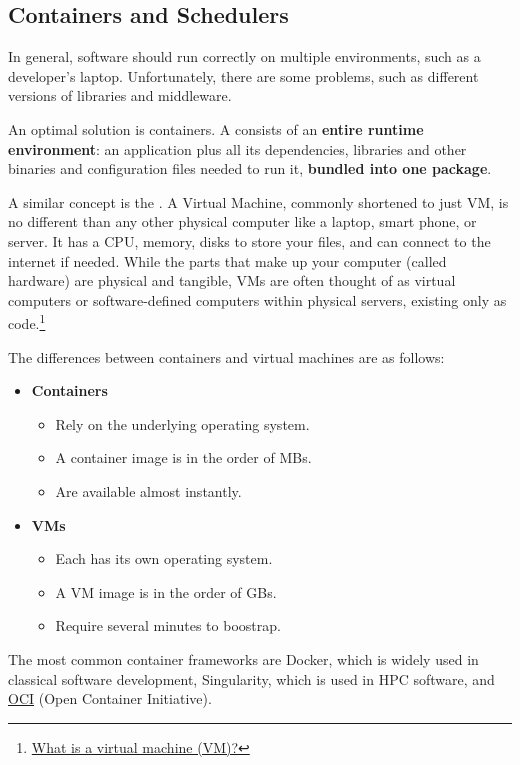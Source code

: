 \subsection{Containers and Schedulers}

In general, software should run correctly on multiple environments, such as a developer's laptop. Unfortunately, there are some problems, such as different versions of libraries and middleware.

\highspace
An optimal solution is containers. A  consists of an \textbf{entire runtime environment}: an application plus all its dependencies, libraries and other binaries and configuration files needed to run it, \textbf{bundled into one package}.

\highspace
A similar concept is the . A Virtual Machine, commonly shortened to just VM, is no different than any other physical computer like a laptop, smart phone, or server. It has a CPU, memory, disks to store your files, and can connect to the internet if needed. While the parts that make up your computer (called hardware) are physical and tangible, VMs are often thought of as virtual computers or software-defined computers within physical servers, existing only as code.\footnote{\href{https://azure.microsoft.com/en-us/resources/cloud-computing-dictionary/what-is-a-virtual-machine/}{What is a virtual machine (VM)?}}

\highspace
The differences between containers and virtual machines are as follows:
\begin{itemize}
    \item \textbf{Containers}
    \begin{itemize}
        \item Rely on the underlying operating system.
        \item A container image is in the order of MBs.
        \item Are available almost instantly.
    \end{itemize}
\end{itemize}
\begin{itemize}
    \item \textbf{VMs}
    \begin{itemize}
        \item Each has its own operating system.
        \item A VM image is in the order of GBs.
        \item Require several minutes to boostrap.
    \end{itemize}
\end{itemize}
The most common container frameworks are Docker, which is widely used in classical software development, Singularity, which is used in HPC software, and \href{https://opencontainers.org/}{OCI} (Open Container Initiative).

